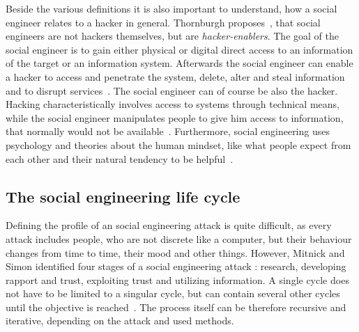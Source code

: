 Beside the various definitions it is also important to understand, how a social
engineer relates to a hacker in general. Thornburgh
proposes~\cite{thornburgh2004}, that social engineers are not hackers
themselves, but are \textit{hacker-enablers}. The goal of the social engineer
is to gain either physical or digital direct access to an information of the
target or an information system. Afterwards the social engineer can enable a
hacker to access and penetrate the system, delete, alter and steal information
and to disrupt services~\cite{thornburgh2004}. The social engineer can of
course be also the hacker. Hacking characteristically involves access to
systems through technical means, while the social engineer manipulates people
to give him access to information, that normally would not be
available~\cite{jones2004}. Furthermore, social engineering uses psychology
and theories about the human mindset, like what people expect from each other
and their natural tendency to be helpful~\cite{jones2004}.


\subsection{The social engineering life cycle}

Defining the profile of an social engineering attack is quite difficult, as
every attack includes people, who are not discrete like a computer, but their
behaviour changes from time to time, their mood and other things. However,
Mitnick and Simon identified four stages of a social engineering attack
\cite{mitnick2003}: research, developing rapport and trust, exploiting trust
and utilizing information. A single cycle does not have to be limited to a
singular cycle, but can contain several other cycles until the objective is
reached~\cite{thornburgh2004}. The process itself can be therefore recursive
and iterative, depending on the attack and used methods.

